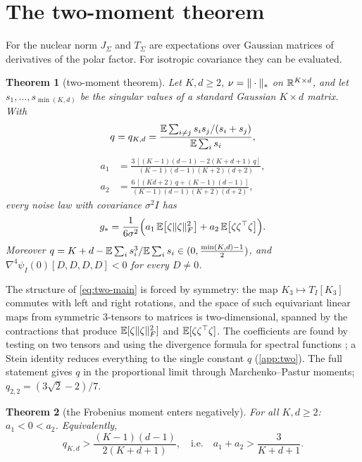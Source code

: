 \documentclass{article}
\theoremstyle{plain}
\newtheorem{theorem}{Theorem}
\theoremstyle{definition}
\theoremstyle{remark}
\begin{document}
\section{The two-moment theorem}\label{sec:two}

For the nuclear norm $J_\Sigma$ and $T_\Sigma$ are expectations over Gaussian matrices of derivatives of the polar
factor. For isotropic covariance they can be evaluated.

\begin{theorem}[two-moment theorem]\label{thm:two}
Let $K,d\ge2$, $\nu=\|\cdot\|_{*}$ on $\mathbb{R}^{K\times d}$, and let $s_1,\dots,s_{\min(K,d)}$ be the singular values of a standard
Gaussian $K\times d$ matrix. With
\begin{equation}\label{eq:q-main}
q=q_{K,d}=\frac{\mathbb{E}\sum_{i\ne j}s_is_j/(s_i+s_j)}{\mathbb{E}\sum_is_i},
\end{equation}
\begin{equation}\label{eq:a-main}
\begin{aligned}
a_1&=\frac{3\,[(K-1)(d-1)-2(K+d+1)\,q]}{(K-1)(d-1)(K+2)(d+2)},\\
a_2&=\frac{6\,[(Kd+2)\,q+(K-1)(d-1)]}{(K-1)(d-1)(K+2)(d+2)},
\end{aligned}
\end{equation}
every noise law with covariance $\sigma^2I$ has
\begin{equation}\label{eq:two-main}
g_\ast=\frac1{6\sigma^2}\Big(a_1\,\mathbb{E}\big[\zeta\|\zeta\|_{F}^2\big]+a_2\,\mathbb{E}\big[\zeta\zeta^\top\zeta\big]\Big).
\end{equation}
Moreover $q=K+d-\mathbb{E}\sum_is_i^3/\mathbb{E}\sum_is_i\in(0,\frac{\min(K,d)-1}2)$, and
$\nabla^4\psi_I(0)[D,D,D,D]<0$ for every $D\ne0$.
\end{theorem}

The structure of \eqref{eq:two-main} is forced by symmetry: the map $K_3\mapsto T_I[K_3]$ commutes with left and right
rotations, and the space of such equivariant linear maps from symmetric $3$-tensors to matrices is two-dimensional,
spanned by the contractions that produce $\mathbb{E}[\zeta\|\zeta\|_{F}^2]$ and $\mathbb{E}[\zeta\zeta^\top\zeta]$. The coefficients are found
by testing on two tensors and using the divergence formula for spectral functions \citep{candes}; a Stein identity
reduces everything to the single constant $q$ (\cref{app:two}). The full statement gives $q$ in the proportional limit
through Marchenko--Pastur moments; $q_{2,2}=(3\sqrt2-2)/7$.

\begin{theorem}[the Frobenius moment enters negatively]\label{thm:a1}
For all $K,d\ge2$: $a_1<0<a_2$. Equivalently,
\[
q_{K,d}>\frac{(K-1)(d-1)}{2(K+d+1)},\quad\text{i.e.}\quad a_1+a_2>\frac3{K+d+1}.
\]
\end{theorem}
\end{document}
